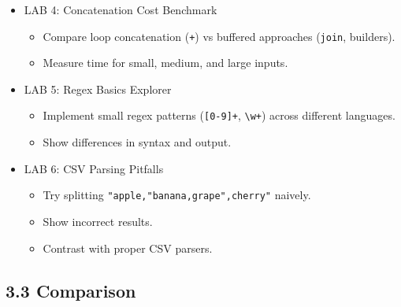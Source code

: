 \documentclass[
  letterpaper,
  DIV=11,
  numbers=noendperiod]{scrreprt}
\providecommand{\tightlist}{%
  \setlength{\itemsep}{0pt}\setlength{\parskip}{0pt}}
\begin{document}
\begin{itemize}
\item
  LAB 4: Concatenation Cost Benchmark

  \begin{itemize}
  \tightlist
  \item
    Compare loop concatenation (\texttt{+}) vs buffered approaches
    (\texttt{join}, builders).
  \item
    Measure time for small, medium, and large inputs.
  \end{itemize}
\item
  LAB 5: Regex Basics Explorer

  \begin{itemize}
  \tightlist
  \item
    Implement small regex patterns (\texttt{{[}0-9{]}+},
    \texttt{\textbackslash{}w+}) across different languages.
  \item
    Show differences in syntax and output.
  \end{itemize}
\item
  LAB 6: CSV Parsing Pitfalls

  \begin{itemize}
  \tightlist
  \item
    Try splitting \texttt{"apple,"banana,grape",cherry"} naively.
  \item
    Show incorrect results.
  \item
    Contrast with proper CSV parsers.
  \end{itemize}
\end{itemize}

\subsection{3.3 Comparison}\label{comparison-2}
\end{document}
